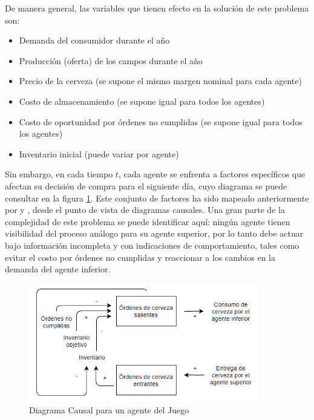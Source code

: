 
De manera general, las variables que tienen efecto en la soluci\'on de este problema son:

\begin{itemize}
    \item Demanda del consumidor durante el a\~no
    \item Producci\'on (oferta) de los campos durante el a\~no
    \item Precio de la cerveza (se supone el mismo margen nominal para cada agente)
    \item Costo de almacenamiento (se supone igual para todos los agentes)
    \item Costo de oportunidad por \'ordenes no cumplidas (se supone igual para todos los agentes)
    \item Inventario inicial (puede variar por agente)
\end{itemize}

Sin embargo, en cada tiempo $t$, cada agente se enfrenta a factores espec\'ificos que afectan su decisi\'on de compra para el siguiente d\'ia, cuyo diagrama se puede consultar en la figura \ref{causal}. Este conjunto de factores ha sido mapeado anteriormente por \citet{Duggan} y \citet{Grasl}, desde el punto de vista de diagramas causales. Una gran parte de la complejidad de este problema se puede identificar aqu\'i: ning\'un agente tienen visibilidad del proceso an\'alogo para su agente superior, por lo tanto debe actuar bajo informaci\'on incompleta y con indicaciones de comportamiento, tales como evitar el costo por \'ordenes no cumplidas y reaccionar a los cambios en la demanda del agente inferior.

\begin{figure}[ht]
\caption{Diagrama Causal para un agente del Juego}
\label{causal}
\includegraphics[width=10cm]{tesis_tex/figs/beer_distribution_game_causal.PNG}
\centering
\end{figure}


